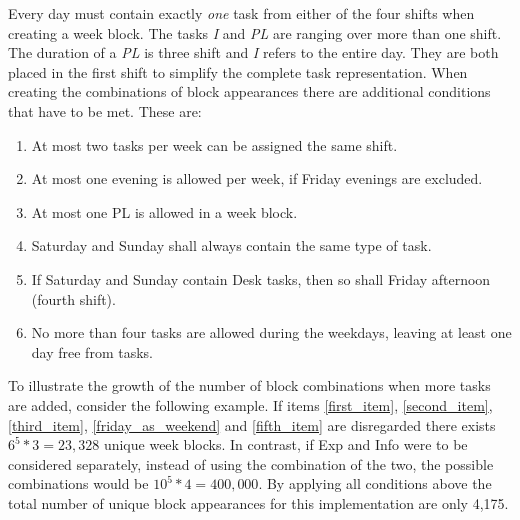 Every day must contain exactly \textit{one} task from either of the four shifts when creating a week block. The tasks \textit{I} and \textit{PL} are ranging over more than one shift. The duration of a \textit{PL} is three shift and \textit{I} refers to the entire day. They are both placed in the first shift to simplify the complete task representation. When creating the combinations of block appearances there are additional conditions that have to be met. These are:
\begin{enumerate}  
\item At most two tasks per week can be assigned the same shift.\label{first_item}
\item At most one evening is allowed per week, if Friday evenings are excluded.\label{second_item}
\item At most one PL is allowed in a week block. \label{third_item}
\item Saturday and Sunday shall always contain the same type of task.\label{fourth_item}
\item If Saturday and Sunday contain Desk tasks, then so shall Friday afternoon (fourth shift). \label{friday_as_weekend}
\item No more than four tasks are allowed during the weekdays, leaving at least one day free from tasks. \label{fifth_item}
\end{enumerate}

To illustrate the growth of the number of block combinations when more tasks are added, consider the following example. If items \ref{first_item}, \ref{second_item}, \ref{third_item}, \ref{friday_as_weekend} and \ref{fifth_item} are disregarded there exists $6^5*3 = 23,328$ unique week blocks. In contrast, if Exp and Info were to be considered separately, instead of using the combination of the two, the possible combinations would be $10^5*4 = 400,000$.  By applying all conditions above the total number of unique block appearances for this implementation are only 4,175. 

